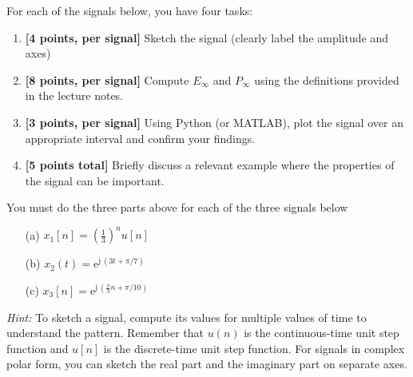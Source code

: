 \documentclass{ee102_pset}
\begin{document}
For each of the signals below, you have four tasks:
\begin{enumerate}
  \item \textbf{[4 points, per signal]} Sketch the signal (clearly label the amplitude and axes)
  \item \textbf{[8 points, per signal]} Compute \(E_{\infty}\) and \(P_{\infty}\) using the definitions provided in the lecture notes.
  \item \textbf{[3 points, per signal]} Using Python (or MATLAB), plot the signal over an appropriate interval and confirm your findings.
  \item \textbf{[5 points total]} Briefly discuss a relevant example where the properties of the signal can be important.
\end{enumerate}
You must do the three parts above for each of the three signals below
\begin{enumerate}
\item[(a)] $x_1[n] = \left(\tfrac{1}{3}\right)^{n} u[n]$

\item[(b)] $x_2(t) = \mathrm{e}^{\mathrm{j}\,(3t+\pi/7)}$

\item[(c)] $x_3[n] = \mathrm{e}^{\mathrm{j}\,(\tfrac{\pi}{3}n+\pi/10)}$
\end{enumerate}
\textit{Hint:} To sketch a signal, compute its values for multiple values of time to understand the pattern. Remember that $u(n)$ is the continuous-time unit step function and $u[n]$ is the discrete-time unit step function. For signals in complex polar form, you can sketch the real part and the imaginary part on separate axes.  
\end{document}

